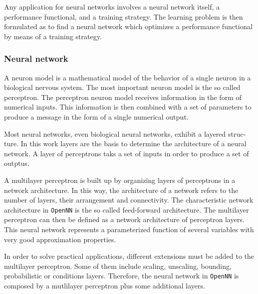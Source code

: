 



Any application for neural networks involves a neural network itself, a performance functional, and a training strategy. 
The learning problem is then formulated as to find a neural network which optimizes a performance functional by means of a training strategy.

\subsubsection*{Neural network}

A neuron model is a mathematical model of the behavior of a single neuron in a
biological nervous system. 
The most important neuron model is the so called perceptron. 
The perceptron neuron model receives information in the form of numerical inputs. 
This information is then combined with a set of parameters to produce a message in the form of a
single numerical output.

Most neural networks, even biological neural networks, exhibit a layered struc-
ture. In this work layers are the basis to determine the architecture of a
neural network. A layer of perceptrons taks a set of inputs in order to produce a set of outptus. 

A multilayer perceptron is
built up by organizing layers of perceptrons in a network architecture.
In this way, the architecture of a network refers to the number of
layers, their arrangement and connectivity. The characteristic
network architecture in \texttt{OpenNN} is the so called
feed-forward architecture. 
The multilayer perceptron can then be defined as a network architecture of perceptron layers. 
This neural network represents a parameterized function of several variables with very good approximation properties. 

In order to solve practical applications, different extensions must be added to the multilayer perceptron. 
Some of them include scaling, unscaling, bounding, probabilistic or conditions layers.
Therefore, the neural network in \texttt{OpenNN} is composed by a mutlilayer perceptron plus some additional layers. 

